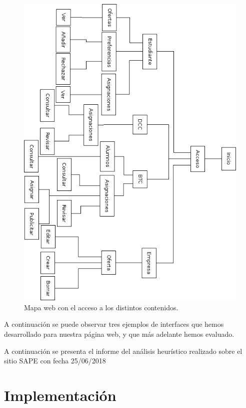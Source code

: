 \documentclass[pdftex,11pt,a4paper]{book}
\begin{document}
\begin{figure}[h]
\begin{center}
\includegraphics[width=\textwidth]{img/arbol_web}
\caption{\label{mapa_web} Mapa web con el acceso a los distintos contenidos.}
\end{center}
\end{figure}

A continuación se puede observar tres ejemplos de interfaces que hemos desarrollado para nuestra página web, y que más adelante hemos evaluado.


A continuación se presenta el informe del análisis heurístico realizado sobre el sitio SAPE con fecha 25/06/2018


\chapter{Implementación}
\end{document}
